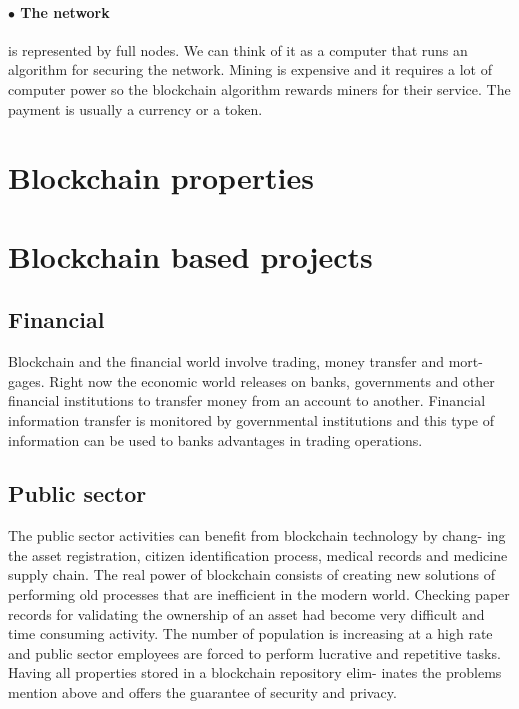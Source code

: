 \paragraph{$\bullet$ The network}is represented by full nodes. We can think of it as a computer that runs an algorithm for securing the network.
Mining is expensive and it requires a lot of computer power so the blockchain algorithm rewards miners for their service. The payment is usually a currency or a token.



\section{Blockchain properties}
\label{sec:chapter2-section2}

\section{Blockchain based projects}
\label{sec:chapter2-section3}

\subsection{Financial}
\label{sub-sec:chapter2-subsection1}
Blockchain and the financial world involve trading, money transfer and mort-
gages. Right now the economic world releases on banks, governments and other
financial institutions to transfer money from an account to another. Financial information transfer is monitored by governmental institutions and this type of information can be used to banks advantages in trading operations.

\subsection{Public sector}
\label{sub-sec:chapter2-subsection2}
The public sector activities can benefit from blockchain technology by chang-
ing the asset registration, citizen identification process, medical records and
medicine supply chain. The real power of blockchain consists of creating new
solutions of performing old processes that are inefficient in the modern world.
Checking paper records for validating the ownership of an asset had become very
difficult and time consuming activity. The number of population is increasing
at a high rate and public sector employees are forced to perform lucrative and
repetitive tasks. Having all properties stored in a blockchain repository elim-
inates the problems mention above and offers the guarantee of security and
privacy.


